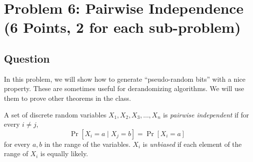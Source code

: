 \documentclass{article}
\begin{document}
\newpage
\section*{Problem 6: Pairwise Independence (6 Points, 2 for each sub-problem)}  

\subsection*{Question}
In this problem, we will show how to generate ``pseudo-random bits'' with a nice property. These are sometimes useful for derandomizing algorithms. We will use them to prove other theorems in the class.

A set of discrete random variables $X_1, X_2, X_3, \ldots, X_n$ is {\em pairwise independent} if for every $i \neq j$,
\[\Pr[ X_i = a \mid X_j = b ] = \Pr[ X_i = a]\] for every $a,b$ in the range of the variables.
$X_i$ is {\em unbiased} if each element of the range of $X_i$ is equally likely.
\end{document}
